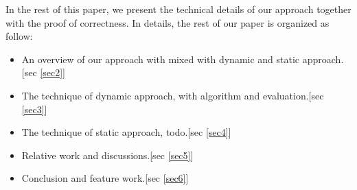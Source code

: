 In the rest of this paper, we present the technical details of our approach together with the proof of correctness. In details, the rest of our paper is organized as follow: 

\begin{itemize}
\item An overview of our approach with mixed with dynamic and static approach.[sec \ref{sec2}]
\item The technique of dynamic approach, with algorithm and evaluation.[sec \ref{sec3}]
\item The technique of static approach, todo.[sec \ref{sec4}]
\item Relative work and discussions.[sec \ref{sec5}]
\item Conclusion and feature work.[sec \ref{sec6}]
\end{itemize}
